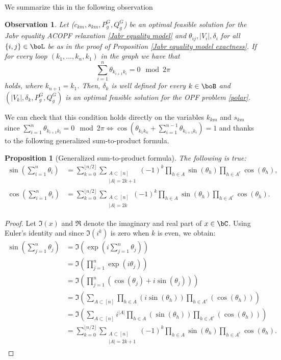 \documentclass[11pt,a4paper,oneside,openany]{book}
\newtheorem{prop}[theorem]{Proposition}
\newtheorem{observation}[theorem]{Observation}
\numberwithin{definition}{section}
\numberwithin{theorem}{section}
\numberwithin{problem}{section}
\begin{document}
We summarize this in the following observation

\begin{observation}\label{Jabr exactness angles}
Let  ($c_{km}, s_{km}, P_g^G, Q_g^G$) be an optimal feasible solution for the Jabr equality ACOPF relaxation \eqref{Jabr equality model} and $\theta_{ij}, |V_i|,\delta_i$ for all $\{i,j\} \in \boL$ be as in the proof of Proposition \ref{Jabr equality model exactness}. If for every loop $(k_1,...,k_n,k_1)$ in the graph we have that
\begin{equation}
    \sum_{i=1}^{n}\theta_{k_{i+1}k_i}=0\mod 2\pi
\end{equation}
holds, where $k_{n+1}=k_1$. Then, $\delta_k$ is well defined for every $k \in \boB$ and $(|V_k|, \delta_k, P_g^G, Q_g^G)$ is an optimal feasible solution for the OPF problem \ref{polar}.
\end{observation}

We can check that this condition holds directly on the variables $k_{km}$ and $s_{km}$ since $ \sum_{i=1}^{n} \theta_{k_{i+1}k_i} = 0 \mod 2\pi \iff \cos(\theta_{k_1k_n} + \sum_{i=1}^{n-1} \theta_{k_{i+1}k_i}) = 1$ and thanks to the following generalized sum-to-product formula.

\begin{prop}[Generalized sum-to-product formula]
\label{sum-to-product}
    The following is true:
    \begin{align}
        \label{sin1}
        \sin\left(\sum_{i=1}^n\theta_i\right) &=\sum_{k = 0}^{\lfloor n/2 \rfloor}\sum_{\substack{A \subset [n]\\|A|=2k+1}}(-1)^k\prod_{h \in A}\sin(\theta_h)\prod_{h \in A^c}\cos(\theta_h), \\
        \label{cos1}
        \cos\left(\sum_{i=1}^n\theta_i\right) &=\sum_{k = 0}^{\lfloor n/2 \rfloor}\sum_{\substack{A \subset [n]\\|A|=2k}}(-1)^k\prod_{h \in A}\sin(\theta_h)\prod_{h \in A^c}\cos(\theta_h).
    \end{align}
\end{prop}

\begin{proof}
Let $\Im(x)$ and $\Re$ denote the imaginary and real part of $x \in \bC$. Using Euler's identity and since $\Im(i^k)$ is zero when $k$ is even, we obtain:
\begin{align*}
\sin\left(\sum_{j=1}^n\theta_j\right) &= \Im(\exp(i\sum_{j=1}^n\theta_j)) \\
&= \Im(\prod_{j=1}^n\exp(i\theta_j)) \\
&= \Im(\prod_{j=1}^n(\cos(\theta_j)+i\sin(\theta_j))) \\
&= \Im(\sum_{A \subset [n]} \prod_{h \in A}(i\sin(\theta_h))\prod_{h \in A^c}(\cos(\theta_h))) \\
&= \Im(\sum_{A \subset [n]} i^{|A|} \prod_{h \in A}(\sin(\theta_h))\prod_{h \in A^c}(\cos(\theta_h))) \\
&= \sum_{k = 0}^{\lfloor n/2 \rfloor}\sum_{\substack{A \subset [n]\\|A|=2k+1}}(-1)^k\prod_{h \in A}\sin(\theta_h)\prod_{h \in A^c}\cos(\theta_h).
\end{align*}

\end{proof}
\end{document}
